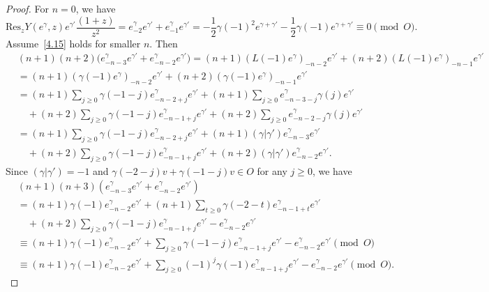 \documentclass[12pt,a4paper,reqno]{amsart}
\numberwithin{equation}{section}
\numberwithin{equation}{section}
\theoremstyle{definition}
\def \ga {\gamma}
\def\Res{\mathrm{Res}}
\begin{document}
\begin{proof}
		For $n=0$, we have
		\[
		\Res_z Y(e^\ga,z)e^{\ga'}\frac{(1+z)}{z^{2}}
		= e^\ga_{-2}e^{\ga'}+e^\ga_{-1}e^{\ga'}
		= -\frac{1}{2}\ga(-1)^2e^{\ga+\ga'}-\frac{1}{2}\ga(-1)e^{\ga+\ga'}
		\equiv 0\pmod{O}.
		\]
		Assume~\eqref{4.15} holds for smaller $n$. Then
		\begin{align*}
			&(n+1)(n+2)\big(e^\ga_{-n-3}e^{\ga'}+e^\ga_{-n-2}e^{\ga'}\big)
			=(n+1)(L(-1)e^\ga)_{-n-2}e^{\ga'}+(n+2)(L(-1)e^\ga)_{-n-1}e^{\ga'}\\
			&=(n+1)(\ga(-1)e^\ga)_{-n-2}e^{\ga'}+(n+2)(\ga(-1)e^\ga)_{-n-1}e^{\ga'}\\
			&=(n+1)\!\sum_{j\geq 0}\!\ga(-1-j)e^\ga_{-n-2+j}e^{\ga'}
			+(n+1)\!\sum_{j\geq 0}\! e^\ga_{-n-3-j}\ga(j)e^{\ga'}\\
			&\quad+(n+2)\!\sum_{j\geq 0}\!\ga(-1-j)e^\ga_{-n-1+j}e^{\ga'}
			+(n+2)\!\sum_{j\geq 0}\! e^\ga_{-n-2-j}\ga(j)e^{\ga'}\\
			&=(n+1)\sum_{j\geq 0}\ga(-1-j)e^\ga_{-n-2+j}e^{\ga'}
			+(n+1)(\ga|\ga')e^{\ga}_{-n-3}e^{\ga'}\\
			&\quad+(n+2)\sum_{j\geq 0}\ga(-1-j)e^\ga_{-n-1+j}e^{\ga'}
			+(n+2)(\ga|\ga')e^{\ga}_{-n-2}e^{\ga'}.
		\end{align*}
		Since $(\ga|\ga')=-1$ and $\ga(-2-j)v+\ga(-1-j)v\in O$ for any $j\geq 0$, we have \begin{align*} &(n+1)(n+3)\left(e^\ga_{-n-3}e^{\ga'}+e^\ga_{-n-2}e^{\ga'}\right)\\
			&=(n+1)\ga(-1)e^\ga_{-n-2}e^{\ga'}+(n+1)\sum_{t\geq 0}\ga(-2-t)e^\ga_{-n-1+t}e^{\ga'}\\
			&\quad +(n+2)\sum_{j\geq 0} \ga(-1-j)e^\ga_{-n-1+j}e^{\ga'}-e^\ga_{-n-2}e^{\ga'}\\ &\equiv (n+1)\ga(-1)e^\ga_{-n-2}e^{\ga'}+\sum_{j\geq 0} \ga(-1-j) e^\ga_{-n-1+j}e^{\ga'}-e^\ga_{-n-2}e^{\ga'}\pmod{O}\\ &\equiv (n+1)\ga(-1)e^\ga_{-n-2}e^{\ga'}+\sum_{j\geq 0} (-1)^j\ga(-1) e^\ga_{-n-1+j}e^{\ga'}-e^\ga_{-n-2}e^{\ga'}\pmod{O}. 
		\end{align*}
		

\end{proof}
\end{document}
